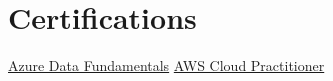 \documentclass[a4paper,10pt]{article}
\begin{document}
\section{\textbf{Certifications}}
\footnotesize{
\href{https://drive.google.com/file/d/1VBJjfRMsIm8BckoUtLUV7ZbY88Jju2qT/view}{Azure Data Fundamentals} \hfill \href{https://drive.google.com/file/d/1a3exoiS79RS3q8vSJHT-PpkczSPg54EZ/view}{AWS Cloud Practitioner}
}
\end{document}
